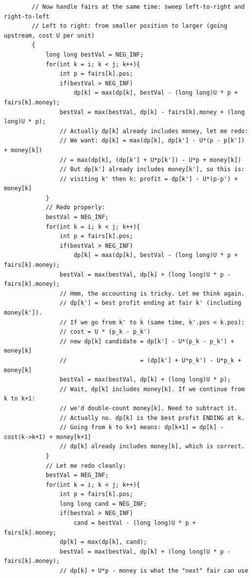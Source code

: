 \documentclass[11pt,a4paper]{article}
\begin{document}
\begin{lstlisting}
        // Now handle fairs at the same time: sweep left-to-right and right-to-left
        // Left to right: from smaller position to larger (going upstream, cost U per unit)
        {
            long long bestVal = NEG_INF;
            for(int k = i; k < j; k++){
                int p = fairs[k].pos;
                if(bestVal > NEG_INF)
                    dp[k] = max(dp[k], bestVal - (long long)U * p + fairs[k].money);
                bestVal = max(bestVal, dp[k] - fairs[k].money + (long long)U * p);
                // Actually dp[k] already includes money, let me redo:
                // We want: dp[k] = max(dp[k], dp[k'] - U*(p - p[k']) + money[k])
                // = max(dp[k], (dp[k'] + U*p[k']) - U*p + money[k])
                // But dp[k'] already includes money[k'], so this is:
                // visiting k' then k: profit = dp[k'] - U*(p-p') + money[k]
            }
            // Redo properly:
            bestVal = NEG_INF;
            for(int k = i; k < j; k++){
                int p = fairs[k].pos;
                if(bestVal > NEG_INF)
                    dp[k] = max(dp[k], bestVal - (long long)U * p + fairs[k].money);
                bestVal = max(bestVal, dp[k] + (long long)U * p - fairs[k].money);
                // Hmm, the accounting is tricky. Let me think again.
                // dp[k'] = best profit ending at fair k' (including money[k']).
                // If we go from k' to k (same time, k'.pos < k.pos):
                // cost = U * (p_k - p_k')
                // new dp[k] candidate = dp[k'] - U*(p_k - p_k') + money[k]
                //                     = (dp[k'] + U*p_k') - U*p_k + money[k]
                bestVal = max(bestVal, dp[k] + (long long)U * p);
                // Wait, dp[k] includes money[k]. If we continue from k to k+1:
                // we'd double-count money[k]. Need to subtract it.
                // Actually no. dp[k] is the best profit ENDING at k.
                // Going from k to k+1 means: dp[k+1] = dp[k] - cost(k->k+1) + money[k+1]
                // dp[k] already includes money[k], which is correct.
            }
            // Let me redo cleanly:
            bestVal = NEG_INF;
            for(int k = i; k < j; k++){
                int p = fairs[k].pos;
                long long cand = NEG_INF;
                if(bestVal > NEG_INF)
                    cand = bestVal - (long long)U * p + fairs[k].money;
                dp[k] = max(dp[k], cand);
                bestVal = max(bestVal, dp[k] + (long long)U * p - fairs[k].money);
                // dp[k] + U*p - money is what the "next" fair can use

\end{lstlisting}
\end{document}
